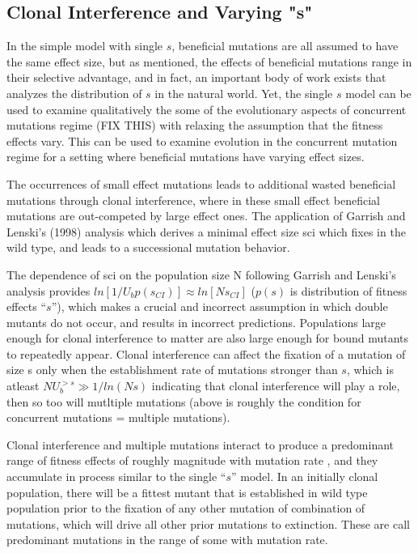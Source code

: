 \documentclass[12pt]{article}
\begin{document}
\subsection*{Clonal Interference and Varying "s"}
In the simple model with single $s$, beneficial mutations are all assumed to have the same effect size, but as mentioned, the effects of beneficial mutations range in their selective advantage, and in fact, an important body of work exists that analyzes the distribution of $s$ in the natural world.  Yet, the single $s$ model can be used to examine qualitatively the some of the evolutionary aspects of concurrent mutations regime (FIX THIS) with relaxing the assumption that the fitness effects vary.  This can be used to examine evolution in the concurrent mutation regime for a setting where beneficial mutations have varying effect sizes.

The occurrences of small effect mutations leads to additional wasted beneficial mutations through clonal interference, where in these small effect beneficial mutations are out-competed by large effect ones.  The application of Garrish and Lenski's (1998) analysis which derives a minimal effect size sci which fixes in the wild type, and leads to a successional mutation behavior.

The dependence of sci on the population size N following Garrish and Lenski's analysis provides $ln[1/U_b p(s_{CI})]\approx ln[Ns_{CI}]$ ($p(s)$ is distribution of fitness effects “$s$”), which makes a crucial and incorrect assumption in which double mutants do not occur, and results in incorrect predictions. Populations large enough for clonal interference to matter are also large enough for bound mutants to repeatedly appear.  Clonal interference can affect the fixation of a mutation of size s only when the establishment rate of  mutations stronger than $s$, which is atleast $NU_b^{>s} \gg 1/ln(Ns)$ indicating that clonal interference will play a role, then so too will mutltiple mutations (above is roughly the condition for concurrent mutations = multiple mutations). 

Clonal interference and multiple mutations interact to produce a predominant range of fitness effects of roughly magnitude with mutation rate , and they accumulate in process similar to the single “$s$” model.
In an initially clonal population, there will be a fittest mutant that is established in wild type population prior to the fixation of any other mutation of combination of mutations, which will drive all other prior mutations to extinction.  These are call predominant mutations in the range of some with mutation rate.
\end{document}
